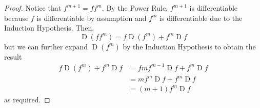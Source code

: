 \documentclass[letterpaper,11pt]{article}
\DeclareMathOperator{\D}{D}
\begin{document}
\begin{enumerate}
\begin{proof}
            Notice that $f^{m+1} = f f^m$.
            By the Power Rule, $f^{m+1}$ is differentiable because $f$ is
            differentiable by assumption and $f^m$ is differentiable due to the
            Induction Hypothesis.
            Then,
            \begin{equation*}
                \D{(f f^m)} = f \D{(f^m)} + f^m \D{f}
            \end{equation*}
            but we can further expand $\D{(f^m)}$ by the Induction Hypothesis
            to obtain the result
            \begin{align*}
                f \D{(f^m)} + f^m \D{f}
                &= f m f^{m-1} \D{f} + f^m \D{f} \\
                &= m f^m \D{f} + f^m \D{f} \\
                &= (m + 1) f^m \D{f}
            \end{align*}
            as required.
        \end{proof}
\end{enumerate}
\end{document}
